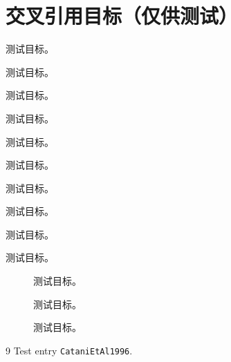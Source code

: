 \section{交叉引用目标（仅供测试）}
\begin{lemma}\label{lem:dy-poles-orientation}测试目标。\end{lemma}
\begin{proposition}\label{prop:dy-abelian-model}测试目标。\end{proposition}
\begin{proposition}\label{prop:dy-eikonal-twogluon}测试目标。\end{proposition}
\begin{theorem}\label{thm:thr-refactorization}测试目标。\end{theorem}
\begin{remark}\label{rem:thr-prescriptions}测试目标。\end{remark}
\begin{proposition}\label{prop:jets-sw}测试目标。\end{proposition}
\begin{proposition}\label{prop:jets-ngl}测试目标。\end{proposition}
\begin{proposition}\label{prop:jets-sll}测试目标。\end{proposition}
\begin{theorem}\label{thm:smallx-bk}测试目标。\end{theorem}
\begin{conjecture}\label{conj:smallx-saturation}测试目标。\end{conjecture}
\begin{figure}[htbp]\centering{}\caption{测试目标。}\label{fig:bfkl-ladder}\end{figure}
\begin{figure}[htbp]\centering{}\caption{测试目标。}\label{fig:glauber-contour}\end{figure}
\begin{figure}[htbp]\centering{}\caption{测试目标。}\label{fig:method-glauber-direction}\end{figure}
\begin{thebibliography}{9}
 Test entry \texttt{CataniEtAl1996}.
\end{thebibliography}

